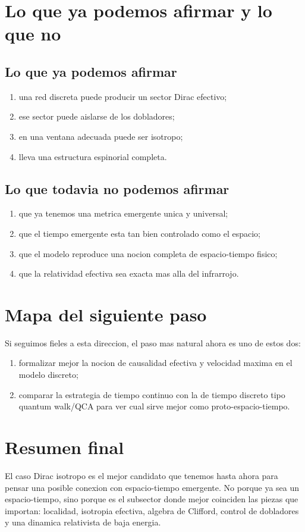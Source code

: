 \section{Lo que ya podemos afirmar y lo que no}
\subsection*{Lo que ya podemos afirmar}
\begin{enumerate}[label=\arabic*.]
    \item una red discreta puede producir un sector Dirac efectivo;
    \item ese sector puede aislarse de los dobladores;
    \item en una ventana adecuada puede ser isotropo;
    \item lleva una estructura espinorial completa.
\end{enumerate}

\subsection*{Lo que todavia no podemos afirmar}
\begin{enumerate}[label=\arabic*.]
    \item que ya tenemos una metrica emergente unica y universal;
    \item que el tiempo emergente esta tan bien controlado como el espacio;
    \item que el modelo reproduce una nocion completa de espacio-tiempo fisico;
    \item que la relatividad efectiva sea exacta mas alla del infrarrojo.
\end{enumerate}

\section{Mapa del siguiente paso}
Si seguimos fieles a esta direccion, el paso mas natural ahora es uno de estos dos:
\begin{enumerate}[label=\arabic*.]
    \item formalizar mejor la nocion de causalidad efectiva y velocidad maxima en el modelo discreto;
    \item comparar la estrategia de tiempo continuo con la de tiempo discreto tipo quantum walk/QCA para ver cual sirve mejor como proto-espacio-tiempo.
\end{enumerate}

\section{Resumen final}
El caso Dirac isotropo es el mejor candidato que tenemos hasta ahora para pensar una posible conexion con espacio-tiempo emergente. No porque ya sea un espacio-tiempo, sino porque es el subsector donde mejor coinciden las piezas que importan: localidad, isotropia efectiva, algebra de Clifford, control de dobladores y una dinamica relativista de baja energia.

